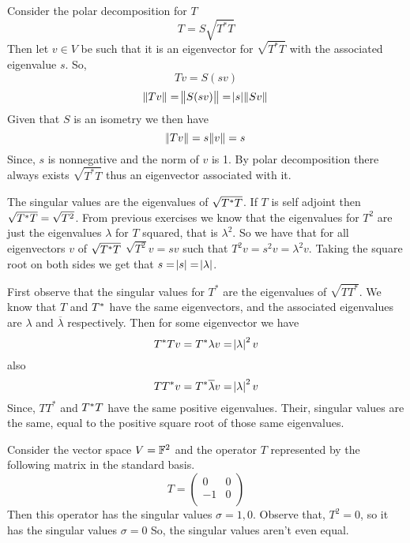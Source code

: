 \documentclass[10pt, twocolumn]{article}
\begin{document}
\begin{q}[4]
    Consider the polar decomposition for $ T $  
    $$ T = S \sqrt{T^* T}$$
    Then let $ v \in V $ be such that it is an eigenvector for $ \sqrt{T^* T} $ with the associated eigenvalue $ s $.
    So, 
    $$ Tv = S(sv) $$
    $$ \norm{Tv} = \norm{S(sv)} = \abs{s}\norm{Sv} $$
    Given that $ S $ is an isometry we then have
    $$ \norm{Tv} = s \norm{v} = s $$
    Since, $ s $ is nonnegative and the norm of $ v $ is 1. 
    By polar decomposition there always exists $ \sqrt{T^* T} $ thus an eigenvector associated with it.
\end{q}

\begin{q}[10]
    The singular values are the eigenvalues of $ \sqrt{T^*T} $. 
    If $ T $ is self adjoint then $ \sqrt{T^*T} = \sqrt{T^2} $. 
    From previous exercises we know that the eigenvalues for $ T^2 $ are just the eigenvalues $ \lambda $ for $ T $ squared, that is $ \lambda^2 $. 
    So we have that for all eigenvectors $ v $ of $ \sqrt{T^*T} $
    $ \sqrt{T^2}v = sv $ such that $ T^2v = s^2v = \lambda^2 v $. 
    Taking the square root on both sides we get that $ s = \abs{s} = \abs{\lambda} $.
\end{q}

\begin{q}[11]
    First observe that the singular values for $ T^* $ are the eigenvalues of 
    $ \sqrt{TT^*} $.
    We know that $ T $ and $ T^* $ have the same eigenvectors,
    and the associated eigenvalues are $ \lambda $ and $ \overline{\lambda} $ respectively. 
    Then for some eigenvector we have 
    $$ T^*Tv = T^*\lambda v = \abs{\lambda}^2 v $$
    also
    $$ TT^*v = T^*\overline{\lambda} v = \abs{\lambda}^2 v $$
    Since, $ TT^* $ and $ T^*T $ have the same positive eigenvalues. 
    Their, singular values are the same, equal to the positive square root of those same eigenvalues.
\end{q}

\begin{q}[12]
    Consider the vector space $ V = \mathbb{F}^2 $ and the operator $ T $ represented by the following matrix in the standard basis.
    $$
    T = 
        \left(
            \begin{array}{cc}
                0 & 0 \\
                -1 & 0 \\ 
            \end{array}
        \right)
    $$
    Then this operator has the singular values $ \sigma = 1, 0 $.
    Observe that, $ T^2 = 0 $, so it has the singular values $ \sigma = 0 $ 
    So, the singular values aren't even equal. 
\end{q}
\end{document}
